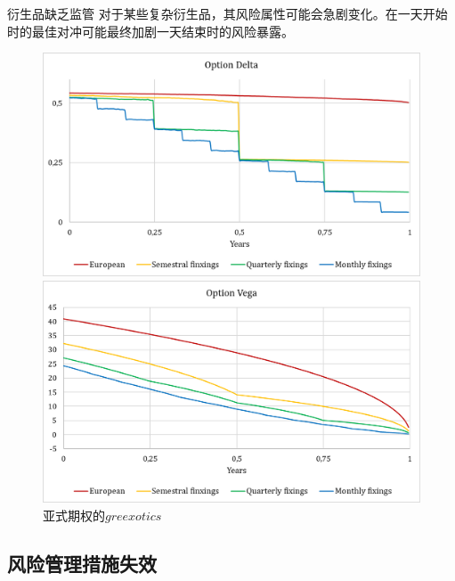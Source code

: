 \begin{frame}{衍生品缺乏监管}
    对于某些复杂衍生品，其风险属性可能会急剧变化。在一天开始时的最佳对冲可能最终加剧一天结束时的风险暴露。
\begin{figure}[H]
    \centering
    \begin{minipage}[t]{0.48\linewidth}
        \includegraphics[width=\linewidth]{img/exo_delta.png}
    \end{minipage}
    \begin{minipage}[t]{0.48\linewidth}
        \includegraphics[width=\linewidth]{img/exo_vega.png}
    \end{minipage}
    \caption{亚式期权的$greexotics$}
    \label{fig:asia}
\end{figure}
\end{frame}

\subsection{风险管理措施失效}\label{sec:5}

